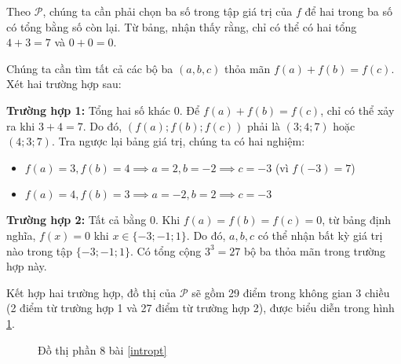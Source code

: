 Theo $\mathcal{P}$, chúng ta cần phải chọn ba số trong tập giá trị của $f$ để hai trong ba số có tổng bằng số còn lại. Từ bảng, nhận thấy rằng, chỉ có thể có hai tổng $4 + 3 = 7$ và $0 + 0 = 0$.

Chúng ta cần tìm tất cả các bộ ba $(a, b, c)$ thỏa mãn $f(a) + f(b) = f(c)$. Xét hai trường hợp sau:

\textbf{Trường hợp 1:} Tổng hai số khác 0. Để $f(a) + f(b) = f(c)$, chỉ có thể xảy ra khi $3 + 4 = 7$. Do đó, $(f(a); f(b); f(c))$ phải là $(3; 4; 7)$ hoặc $(4; 3; 7)$. Tra ngược lại bảng giá trị, chúng ta có hai nghiệm:
  \begin{itemize}
     \item $f(a)=3, f(b)=4 \implies a=2, b=-2 \implies c=-3$ (vì $f(-3)=7$)
     \item $f(a)=4, f(b)=3 \implies a=-2, b=2 \implies c=-3$
  \end{itemize}

\textbf{Trường hợp 2:} Tất cả bằng 0. Khi $f(a) = f(b) = f(c) = 0$, từ bảng định nghĩa, $f(x)=0$ khi $x \in \{-3; -1; 1\}$. Do đó, $a, b, c$ có thể nhận bất kỳ giá trị nào trong tập $\{-3; -1; 1\}$. Có tổng cộng $3^3 = 27$ bộ ba thỏa mãn trong trường hợp này.

Kết hợp hai trường hợp, đồ thị của $\mathcal{P}$ sẽ gồm 29 điểm trong không gian 3 chiều (2 điểm từ trường hợp 1 và 27 điểm từ trường hợp 2), được biểu diễn trong hình \ref{fig:ham_so_mot_bien:dinh_nghia:dtp8}.

\begin{figure}[H]
   \centering
   \caption{Đồ thị phần 8 bài \ref{intropt}}
   \label{fig:ham_so_mot_bien:dinh_nghia:dtp8}
\end{figure}

